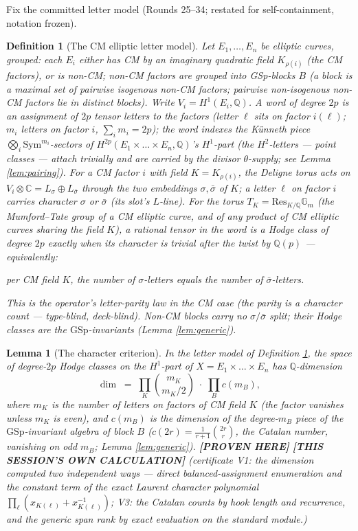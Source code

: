 \documentclass[11pt]{article}
\newtheorem{lemma}[theorem]{Lemma}
\newtheorem{definition}[theorem]{Definition}
\newcommand{\PROVEN}{\textbf{[PROVEN HERE]}}
\newcommand{\MINE}{\textbf{[THIS SESSION'S OWN CALCULATION]}}
\newcommand{\Q}{\mathbb{Q}}
\newcommand{\C}{\mathbb{C}}
\newcommand{\GSp}{\mathrm{GSp}}
\begin{document}
Fix the committed letter model (Rounds 25--34; restated for
self-containment, notation frozen).

\begin{definition}[The CM elliptic letter model]\label{def:letters}
Let $E_1,\dots,E_n$ be elliptic curves, grouped: each $E_i$ either has
CM by an imaginary quadratic field $K_{\rho(i)}$ (the \emph{CM
factors}), or is non-CM; non-CM factors are grouped into
\emph{GSp-blocks} $B$ (a block is a maximal set of pairwise isogenous
non-CM factors; pairwise non-isogenous non-CM factors lie in distinct
blocks). Write $V_i=H^1(E_i,\Q)$. A \emph{word of degree $2p$} is an
assignment of $2p$ tensor letters to the factors (letter $\ell$ sits on
factor $i(\ell)$; $m_i$ letters on factor $i$, $\sum_i m_i=2p$); the
word indexes the K\"unneth piece
$\bigotimes_i \mathrm{Sym}^{m_i}$-sectors of
$H^{2p}(E_1\times\dots\times E_n,\Q)$'s $H^1$-part (the $H^2$-letters
--- point classes --- attach trivially and are carried by the divisor
$\theta$-supply; see Lemma \ref{lem:pairing}).
For a CM factor $i$ with field $K=K_{\rho(i)}$, the Deligne torus acts on
$V_i\otimes\C=L_{\sigma}\oplus L_{\bar\sigma}$ through the two embeddings
$\sigma,\bar\sigma$ of $K$; a letter $\ell$ on factor $i$ carries
\emph{character} $\sigma$ or $\bar\sigma$ (its slot's $L$-line). For the
torus $T_K=\mathrm{Res}_{K/\Q}\mathbb{G}_m$ (the Mumford--Tate group of
a CM elliptic curve, and of any product of CM elliptic curves sharing
the field $K$), a rational tensor in the word is a Hodge class of degree
$2p$ exactly when its character is trivial after the twist by
$\Q(p)$ --- equivalently:
\begin{center}
\emph{per CM field $K$, the number of $\sigma$-letters equals the number
of $\bar\sigma$-letters.}
\end{center}
This is the operator's letter-parity law in the CM case (the parity is a
character count --- type-blind, deck-blind). Non-CM blocks carry no
$\sigma/\bar\sigma$ split; their Hodge classes are the
$\GSp$-invariants (Lemma \ref{lem:generic}).
\end{definition}

\begin{lemma}[The character criterion]\label{lem:character}
In the letter model of Definition \ref{def:letters}, the space of degree-$2p$
Hodge classes on the $H^1$-part of
$X=E_1\times\dots\times E_n$ has $\Q$-dimension
\[
\dim \;=\; \prod_{K}\binom{m_K}{m_K/2}\;\cdot\;\prod_{B} c(m_B),
\]
where $m_K$ is the number of letters on factors of CM field $K$
(the factor vanishes unless $m_K$ is even), and $c(m_B)$ is the dimension
of the degree-$m_B$ piece of the $\GSp$-invariant algebra of block $B$
($c(2r)=\frac{1}{r+1}\binom{2r}{r}$, the Catalan number, vanishing on
odd $m_B$; Lemma \ref{lem:generic}).
\PROVEN{} \MINE{} (certificate V1: the dimension computed two independent
ways --- direct balanced-assignment enumeration and the constant term of
the exact Laurent character polynomial
$\prod_\ell(x_{K(\ell)}+x_{K(\ell)}^{-1})$; V3: the Catalan counts by
hook length and recurrence, and the generic span rank by exact
evaluation on the standard module.)
\end{lemma}
\end{document}
